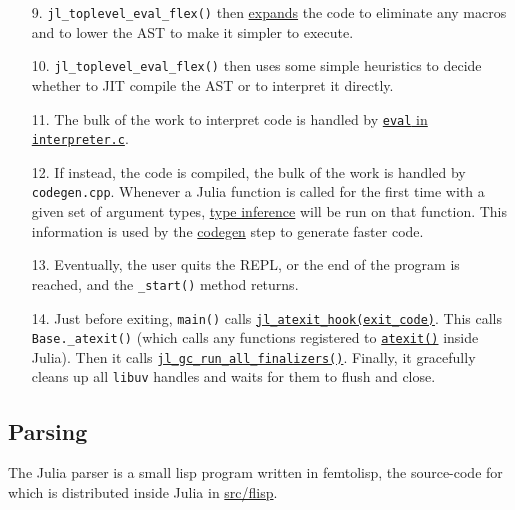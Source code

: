\begin{itemize}
\item[9.  ] \texttt{jl\_toplevel\_eval\_flex()} then \hyperlink{16669853702383402486}{expands} the code to eliminate any macros and to {\textquotedbl}lower{\textquotedbl} the AST to make it simpler to execute.


\item[10. ] \texttt{jl\_toplevel\_eval\_flex()} then uses some simple heuristics to decide whether to JIT compile the  AST or to interpret it directly.


\item[11. ] The bulk of the work to interpret code is handled by \href{https://github.com/JuliaLang/julia/blob/master/src/interpreter.c}{\texttt{eval} in \texttt{interpreter.c}}.


\item[12. ] If instead, the code is compiled, the bulk of the work is handled by \texttt{codegen.cpp}. Whenever a  Julia function is called for the first time with a given set of argument types, \hyperlink{6510123671388929580}{type inference}  will be run on that function. This information is used by the \hyperlink{526576549562645049}{codegen} step to generate  faster code.


\item[13. ] Eventually, the user quits the REPL, or the end of the program is reached, and the \texttt{\_start()}  method returns.


\item[14. ] Just before exiting, \texttt{main()} calls \href{https://github.com/JuliaLang/julia/blob/master/src/init.c}{\texttt{jl\_atexit\_hook(exit\_code)}}.  This calls \texttt{Base.\_atexit()} (which calls any functions registered to \hyperlink{17479944696971324992}{\texttt{atexit()}} inside  Julia). Then it calls \href{https://github.com/JuliaLang/julia/blob/master/src/gc.c}{\texttt{jl\_gc\_run\_all\_finalizers()}}.  Finally, it gracefully cleans up all \texttt{libuv} handles and waits for them to flush and close.

\end{itemize}


\hypertarget{6801832859572424777}{}


\subsection{Parsing}



The Julia parser is a small lisp program written in femtolisp, the source-code for which is distributed inside Julia in \href{https://github.com/JuliaLang/julia/tree/master/src/flisp}{src/flisp}.



